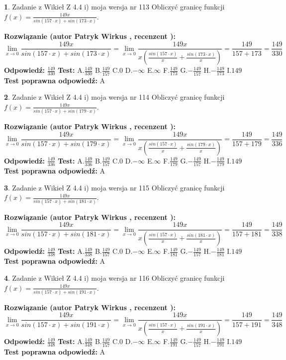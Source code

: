 \documentclass[12pt, a4paper]{article}
\theoremstyle{definition} %
\newtheorem{zad}{}
\newcommand{\zadStart}[1]{\begin{zad}#1\newline}
\newcommand{\zadStop}{\end{zad}}
\newcommand{\rozwStart}[2]{\noindent \textbf{Rozwiązanie (autor #1 , recenzent #2): }\newline}
\newcommand{\rozwStop}{\newline}
\newcommand{\odpStart}{\noindent \textbf{Odpowiedź:}\newline}
\newcommand{\odpStop}{\newline}
\newcommand{\testStart}{\noindent \textbf{Test:}\newline}
\newcommand{\testStop}{\newline}
\newcommand{\kluczStart}{\noindent \textbf{Test poprawna odpowiedź:}\newline}
\newcommand{\kluczStop}{\newline}
\begin{document}
\zadStart{Zadanie z Wikieł Z 4.4 i) moja wersja nr 113}
Obliczyć granicę funkcji $f(x)=\frac{149x}{sin(157\cdot x) +sin(173\cdot x)}$.
\zadStop
\rozwStart{Patryk Wirkus}{}
$$\lim\limits_{x\to 0}\frac{149x}{sin(157\cdot x) +sin(173\cdot x)}=\lim\limits_{x\to 0}\frac{149x}{x(\frac{sin(157\cdot x)}{x}+\frac{sin(173\cdot x)}{x})}=\frac{149}{157+173} = \frac{149}{330}$$
\rozwStop
\odpStart
$\frac{149}{330}$
\odpStop
\testStart
A.$\frac{149}{330}$
B.$\frac{149}{157}$
C.$0$
D.$-\infty$
E.$\infty$
F.$\frac{149}{173}$
G.$-\frac{149}{157}$
H.$-\frac{149}{173}$
I.$149$
\testStop
\kluczStart
A
\kluczStop



\zadStart{Zadanie z Wikieł Z 4.4 i) moja wersja nr 114}
Obliczyć granicę funkcji $f(x)=\frac{149x}{sin(157\cdot x) +sin(179\cdot x)}$.
\zadStop
\rozwStart{Patryk Wirkus}{}
$$\lim\limits_{x\to 0}\frac{149x}{sin(157\cdot x) +sin(179\cdot x)}=\lim\limits_{x\to 0}\frac{149x}{x(\frac{sin(157\cdot x)}{x}+\frac{sin(179\cdot x)}{x})}=\frac{149}{157+179} = \frac{149}{336}$$
\rozwStop
\odpStart
$\frac{149}{336}$
\odpStop
\testStart
A.$\frac{149}{336}$
B.$\frac{149}{157}$
C.$0$
D.$-\infty$
E.$\infty$
F.$\frac{149}{179}$
G.$-\frac{149}{157}$
H.$-\frac{149}{179}$
I.$149$
\testStop
\kluczStart
A
\kluczStop



\zadStart{Zadanie z Wikieł Z 4.4 i) moja wersja nr 115}
Obliczyć granicę funkcji $f(x)=\frac{149x}{sin(157\cdot x) +sin(181\cdot x)}$.
\zadStop
\rozwStart{Patryk Wirkus}{}
$$\lim\limits_{x\to 0}\frac{149x}{sin(157\cdot x) +sin(181\cdot x)}=\lim\limits_{x\to 0}\frac{149x}{x(\frac{sin(157\cdot x)}{x}+\frac{sin(181\cdot x)}{x})}=\frac{149}{157+181} = \frac{149}{338}$$
\rozwStop
\odpStart
$\frac{149}{338}$
\odpStop
\testStart
A.$\frac{149}{338}$
B.$\frac{149}{157}$
C.$0$
D.$-\infty$
E.$\infty$
F.$\frac{149}{181}$
G.$-\frac{149}{157}$
H.$-\frac{149}{181}$
I.$149$
\testStop
\kluczStart
A
\kluczStop



\zadStart{Zadanie z Wikieł Z 4.4 i) moja wersja nr 116}
Obliczyć granicę funkcji $f(x)=\frac{149x}{sin(157\cdot x) +sin(191\cdot x)}$.
\zadStop
\rozwStart{Patryk Wirkus}{}
$$\lim\limits_{x\to 0}\frac{149x}{sin(157\cdot x) +sin(191\cdot x)}=\lim\limits_{x\to 0}\frac{149x}{x(\frac{sin(157\cdot x)}{x}+\frac{sin(191\cdot x)}{x})}=\frac{149}{157+191} = \frac{149}{348}$$
\rozwStop
\odpStart
$\frac{149}{348}$
\odpStop
\testStart
A.$\frac{149}{348}$
B.$\frac{149}{157}$
C.$0$
D.$-\infty$
E.$\infty$
F.$\frac{149}{191}$
G.$-\frac{149}{157}$
H.$-\frac{149}{191}$
I.$149$
\testStop
\kluczStart
A
\kluczStop
\end{document}
